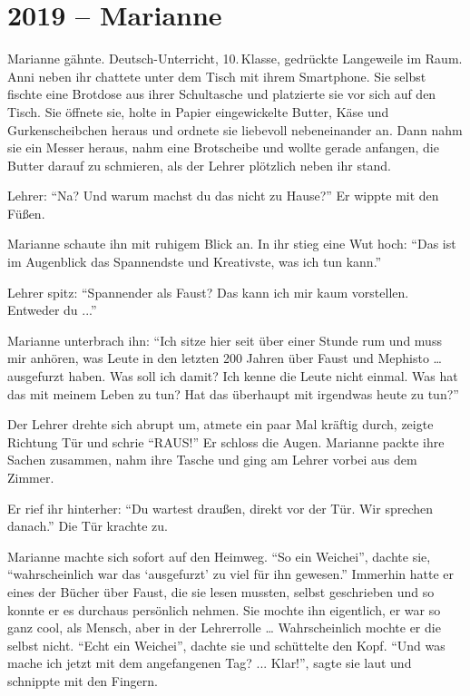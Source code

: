 \chapter{2019 -- Marianne} %
\label{cha:2019_marianne}

Marianne gähnte. Deutsch-Unterricht, 10.\,Klasse, gedrückte Langeweile im Raum.
Anni neben ihr chattete unter dem Tisch mit ihrem Smartphone.
Sie selbst fischte eine Brotdose aus ihrer Schultasche und platzierte sie vor sich auf den Tisch.
Sie öffnete sie, holte in Papier eingewickelte Butter, Käse und Gurkenscheibchen heraus und ordnete sie liebevoll nebeneinander an.
Dann nahm sie ein Messer heraus, nahm eine Brotscheibe und wollte gerade anfangen, die Butter darauf zu schmieren, als der Lehrer plötzlich neben ihr stand.


Lehrer: \enquote{Na? Und warum machst du das nicht zu Hause?} Er wippte mit den Füßen.

Marianne schaute ihn mit ruhigem Blick an.
In ihr stieg eine Wut hoch: \enquote{Das ist im Augenblick das Spannendste und Kreativste, was ich tun kann.}

Lehrer spitz: \enquote{Spannender als Faust? Das kann ich mir kaum vorstellen.
Entweder du ...}

Marianne unterbrach ihn: \enquote{Ich sitze hier seit über einer Stunde rum und muss mir anhören, was Leute in den letzten 200 Jahren über Faust und Mephisto … ausgefurzt haben.
Was soll ich damit? Ich kenne die Leute nicht einmal.
Was hat das mit meinem Leben zu tun? Hat das überhaupt mit irgendwas heute zu tun?} 

Der Lehrer drehte sich abrupt um, atmete ein paar Mal kräftig durch, zeigte Richtung Tür und schrie \enquote{RAUS!} Er schloss die Augen.
Marianne packte ihre Sachen zusammen, nahm ihre Tasche und ging am Lehrer vorbei aus dem Zimmer.

Er rief ihr hinterher: \enquote{Du wartest draußen, direkt vor der Tür.
Wir sprechen danach.} Die Tür krachte zu.

Marianne machte sich sofort auf den Heimweg.
\enquote{So ein Weichei}, dachte sie, \enquote{wahrscheinlich war das \enquote{ausgefurzt} zu viel für ihn gewesen.} Immerhin hatte er eines der Bücher über Faust, die sie lesen mussten, selbst geschrieben und so konnte er es durchaus persönlich nehmen.
Sie mochte ihn eigentlich, er war so ganz cool, als Mensch, aber in der Lehrerrolle … Wahrscheinlich mochte er die selbst nicht.
\enquote{Echt ein Weichei}, dachte sie und schüttelte den Kopf.
\enquote{Und was mache ich jetzt mit dem angefangenen Tag? ...
Klar!}, sagte sie laut und schnippte mit den Fingern.

